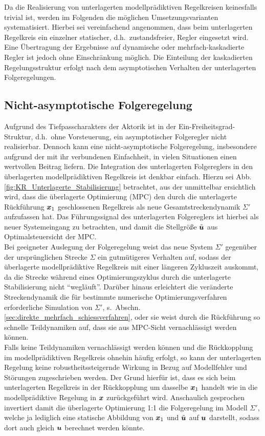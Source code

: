 Da die Realisierung von unterlagerten modellprädiktiven Regelkreisen keinesfalls trivial ist, werden im Folgenden die möglichen Umsetzungsvarianten systematisiert. Hierbei sei vereinfachend angenommen, dass beim unterlagerten Regelkreis ein einzelner statischer, d.h.\ zustandsfreier, Regler eingesetzt wird. Eine Übertragung der Ergebnisse auf dynamische oder mehrfach-kaskadierte Regler ist jedoch ohne Einschränkung möglich.
Die Einteilung der kaskadierten Regelungsstruktur erfolgt nach dem asymptotischen Verhalten der unterlagerten Folgeregelungen.

\subsection{Nicht-asymptotische Folgeregelung} \label{sec:nichtasymptotischeFolgeregelung}
Aufgrund des Tiefpasscharakters der Aktorik ist in der Ein-Freiheitsgrad-Struktur, d.h.\ ohne Vorsteuerung, ein asymptotischer Folgeregler nicht realisierbar. Dennoch kann eine nicht-asymptotische Folgeregelung, insbesondere aufgrund der mit ihr verbundenen Einfachheit, in vielen Situationen einen wertvollen Beitrag liefern.
Die Integration des unterlagerten Folgereglers in den überlagerten modellprädiktiven Regelkreis ist denkbar einfach. Hierzu sei Abb.\,\ref{fig:KR_Unterlagerte_Stabilisierung} betrachtet, aus der unmittelbar ersichtlich wird, dass die überlagerte Optimierung (MPC) den durch die unterlagerte Rückführung $\boldsymbol{x}_1$ geschlossenen Regelkreis als neue Gesamtstreckendynamik $\Sigma'$ aufzufassen hat. Das Führungssignal des unterlagerten Folgereglers ist hierbei als neuer Systemeingang zu betrachten, und damit die Stellgröße $\tilde{\boldsymbol{u}}$ aus Optimalsteuersicht der MPC. \\
Bei geeigneter Auslegung der Folgeregelung weist das neue System $\Sigma'$ gegenüber der ursprünglichen Strecke $\Sigma$ ein gutmütigeres Verhalten auf, sodass der überlagerte modellprädiktive Regelkreis mit einer längeren Zykluszeit auskommt, da die Strecke während eines Optimierungszyklus durch die unterlagerte Stabilisierung nicht "`wegläuft"'. Darüber hinaus erleichtert die veränderte Streckendynamik die für bestimmte numerische Optimierungsverfahren erforderliche Simulation von $\Sigma'$, s.\ Abschn.\,\ref{sec:direkte_mehrfach_schiessverfahren}, oder sie weist durch die Rückführung so schnelle Teildynamiken auf, dass sie aus MPC-Sicht vernachlässigt werden können. \\
Falls keine Teildynamiken vernachlässigt werden können und die Rückkopplung im modellprädiktiven Regelkreis ohnehin häufig erfolgt, so kann der unterlagerten Regelung \iA keine robustheitssteigernde Wirkung in Bezug auf Modellfehler und Störungen zugeschrieben werden. Der Grund hierfür ist, dass es sich beim unterlagerten Regelkreis in der Rückkopplung um dasselbe $\boldsymbol{x}_1$ handelt wie in die modellprädiktive Regelung in $\boldsymbol{x}$ zurückgeführt wird. Anschaulich gesprochen invertiert damit die überlagerte Optimierung 1:1 die Folgeregelung im Modell $\Sigma'$, welche ja lediglich eine statische Abbildung von $\boldsymbol{x}_1$ und $\tilde{\boldsymbol{u}}$ auf $\boldsymbol{u}$ darstellt, sodass dort auch gleich $\boldsymbol{u}$ berechnet werden könnte.

